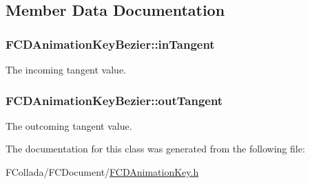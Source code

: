 \subsection{Member Data Documentation}
\hypertarget{classFCDAnimationKeyBezier_a9376d6dde01d5a78629935b1bebf1ac1}{
\subsubsection[{inTangent}]{ {\bf FCDAnimationKeyBezier::inTangent}}}
\label{classFCDAnimationKeyBezier_a9376d6dde01d5a78629935b1bebf1ac1}
The incoming tangent value. \hypertarget{classFCDAnimationKeyBezier_a46baf873490cd046c4b54ea4f8926bf7}{
\subsubsection[{outTangent}]{ {\bf FCDAnimationKeyBezier::outTangent}}}
\label{classFCDAnimationKeyBezier_a46baf873490cd046c4b54ea4f8926bf7}
The outcoming tangent value. 

The documentation for this class was generated from the following file:\begin{DoxyCompactItemize}
\item 
FCollada/FCDocument/\hyperlink{FCDAnimationKey_8h}{FCDAnimationKey.h}\end{DoxyCompactItemize}
